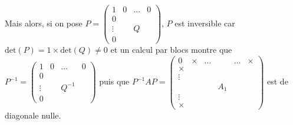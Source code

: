{{Mais alors, si on pose $P=\left(
\begin{array}{cccc}
1&0&\ldots&0\\
0& & & \\
\vdots& &Q& \\
0& & & 
\end{array}
\right)$, $P$ est inversible car $\text{det}(P)=1\times\text{det}(Q)\neq0$ et un calcul par blocs montre que $P^{-1}=\left(
\begin{array}{cccc}
1&0&\ldots&0\\
0& & & \\
\vdots& &Q^{-1}& \\
0& & & 
\end{array}
\right)$ puis que $P^{-1}AP=\left(
\begin{array}{cccccc}
0&\times&\ldots& &\ldots&\times\\
\times& & & & \\
\vdots& & &  & \\
 & & &A_1& & \\
\vdots& \\
\times&
\end{array}
\right)$ est de diagonale nulle.
}
}
